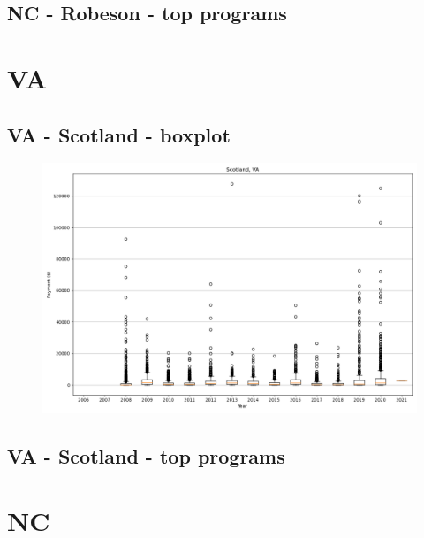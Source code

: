 \subsection*{NC - Robeson - top programs}

\newpage
\section*{VA}
\subsection*{VA - Scotland - boxplot}
\begin{figure}[h]
\centering
\includegraphics[width=7in]{../output/boxplots/counties/Scotland-VA_boxplot.png}
\end{figure}


\subsection*{VA - Scotland - top programs}

\newpage
\section*{NC}
